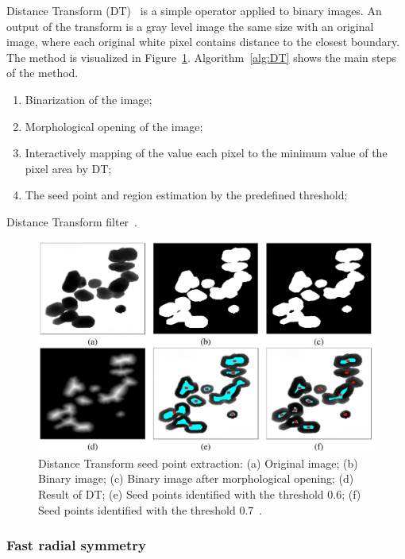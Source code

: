 \documentclass{lutmscthesis}[2010/09/22]
\begin{document}
Distance Transform (DT)~\cite{DT} is a simple operator applied to binary images. An output of the transform is a gray level image the same size with an original image, where each original white pixel contains distance to the closest boundary.
The method is visualized in Figure~\ref{fig:DT_img}. Algorithm~\ref{alg:DT} shows the main steps of the method.

\begin{algorithm} [H]
   \begin{enumerate}
        \item Binarization of the image;
        \item Morphological opening of the image;
        \item Interactively mapping of the value each pixel to the minimum value of the pixel area by DT;
        \item The seed point and region estimation by the predefined threshold;
    \end{enumerate}
    \caption{Distance Transform filter~\cite{DT-bactery}.}\label{alg:DT}
\end{algorithm}

\begin{figure} [ht]
  \includegraphics[width=\linewidth]{DT.png}
  \caption{
    Distance Transform seed point extraction: (a) Original image; (b) Binary image;
    (c) Binary image after morphological opening; 
    (d) Result of DT; 
    (e) Seed points identified with the threshold 0.6; 
    (f) Seed points identified with the threshold 0.7~\cite{zafari-thesis}.}
  \label{fig:DT_img}
\end{figure}


\subsubsection{Fast radial symmetry}
\end{document}
